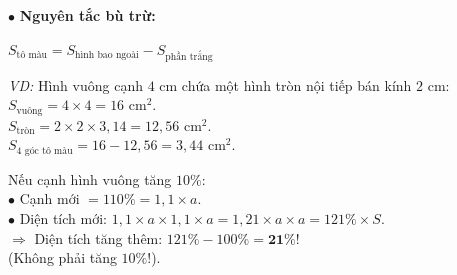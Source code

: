 \documentclass[14pt,a4paper,oneside]{extbook}
\begin{document}
\noindent
\begin{minipage}[t]{0.52\textwidth}
  \begin{tcolorbox}[
    enhanced,
    title={\footnotesize\bfseries\color{white}\faPaintBrush\ 2. Phương pháp tính diện tích phần tô màu},
    colback=teal!2!white,
    colframe=teal!75!black,
    arc=2.5mm, boxrule=0.8pt, top=1.8mm, bottom=1.8mm, left=2.2mm, right=2.2mm
  ]
    \footnotesize
    $\bullet$ \textbf{Nguyên tắc bù trừ:}\\
    \begin{tcolorbox}[colback=white, colframe=teal!75!black, boxrule=0.5pt, arc=1.5mm, halign=center, top=1mm, bottom=1mm]
      {\scriptsize\bfseries\color{teal!95!black}$S_{\text{tô màu}} = S_{\text{hình bao ngoài}} - S_{\text{phần trắng}}$}
    \end{tcolorbox}
    \textit{VD:} Hình vuông cạnh $4\text{ cm}$ chứa một hình tròn nội tiếp bán kính $2\text{ cm}$:\\
    $S_{\text{vuông}} = 4 \times 4 = 16\text{ cm}^2$.\\
    $S_{\text{tròn}} = 2 \times 2 \times 3,14 = 12,56\text{ cm}^2$.\\
    $S_{\text{4 góc tô màu}} = 16 - 12,56 = 3,44\text{ cm}^2$.
  \end{tcolorbox}
\end{minipage}%
\hfill
\begin{minipage}[t]{0.46\textwidth}
  \begin{tcolorbox}[
    enhanced,
    title={\footnotesize\bfseries\color{white}\faSliders\ 3. Tỉ số phần trăm diện tích},
    colback=purple!2!white,
    colframe=purple!70!black,
    arc=2.5mm, boxrule=0.8pt, top=1.8mm, bottom=1.8mm, left=2mm, right=2mm
  ]
    \footnotesize
    Nếu cạnh hình vuông tăng $10\%$:\\
    $\bullet$ Cạnh mới $= 110\% = 1,1 \times a$.\\
    $\bullet$ Diện tích mới: $1,1 \times a \times 1,1 \times a = 1,21 \times a \times a = 121\% \times S$.\\
    $\Rightarrow$ Diện tích tăng thêm: $121\% - 100\% = \mathbf{21\%}$!\\
    (Không phải tăng $10\%$!).
  \end{tcolorbox}
\end{minipage}

\vspace{3mm}
\end{document}
